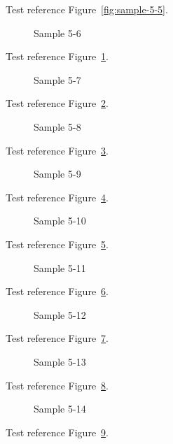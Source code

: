 Test reference Figure~\ref{fig:sample-5-5}.

\begin{figure}[tbhp]
\caption{Sample 5-6}
\label{fig:sample-5-6}
\end{figure}

Test reference Figure~\ref{fig:sample-5-6}.

\begin{figure}[tbhp]
\caption{Sample 5-7}
\label{fig:sample-5-7}
\end{figure}

Test reference Figure~\ref{fig:sample-5-7}.

\begin{figure}[tbhp]
\caption{Sample 5-8}
\label{fig:sample-5-8}
\end{figure}

Test reference Figure~\ref{fig:sample-5-8}.

\begin{figure}[tbhp]
\caption{Sample 5-9}
\label{fig:sample-5-9}
\end{figure}

Test reference Figure~\ref{fig:sample-5-9}.

\begin{figure}[tbhp]
\caption{Sample 5-10}
\label{fig:sample-5-10}
\end{figure}

Test reference Figure~\ref{fig:sample-5-10}.

\begin{figure}[tbhp]
\caption{Sample 5-11}
\label{fig:sample-5-11}
\end{figure}

Test reference Figure~\ref{fig:sample-5-11}.

\begin{figure}[tbhp]
\caption{Sample 5-12}
\label{fig:sample-5-12}
\end{figure}

Test reference Figure~\ref{fig:sample-5-12}.

\begin{figure}[tbhp]
\caption{Sample 5-13}
\label{fig:sample-5-13}
\end{figure}

Test reference Figure~\ref{fig:sample-5-13}.

\begin{figure}[tbhp]
\caption{Sample 5-14}
\label{fig:sample-5-14}
\end{figure}

Test reference Figure~\ref{fig:sample-5-14}.

